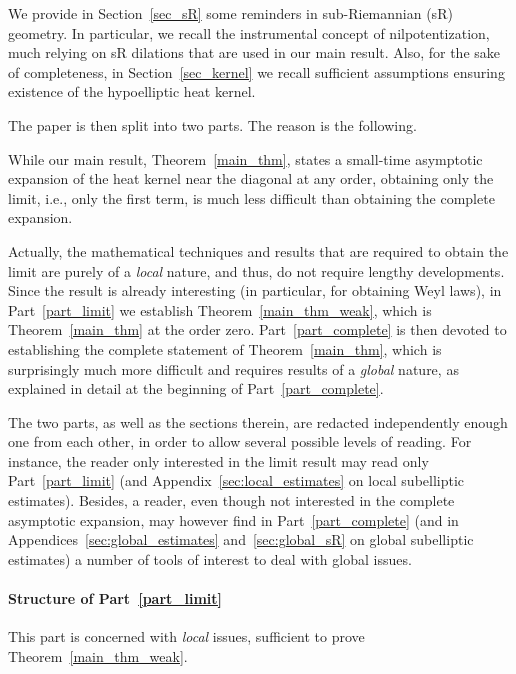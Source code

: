 \documentclass[10pt]{amsart}
\theoremstyle{definition}\newtheorem{defi}[theo]{Definition}\newtheorem{rema}[theo]{Remark}\newtheorem{exam}[theo]{Example}\newtheorem{exem}[theo]{Example}\newtheorem{nota}[theo]{Notation}
\begin{document}

We provide in Section~\ref{sec_sR} some reminders in sub-Riemannian (sR) geometry. In particular, we recall the instrumental concept of nilpotentization, much relying on sR dilations that are used in our main result. Also, for the sake of completeness, in Section~\ref{sec_kernel} we recall sufficient assumptions ensuring existence of the hypoelliptic heat kernel.


The paper is then split into two parts. The reason is the following.

While our main result, Theorem~\ref{main_thm}, states a small-time asymptotic expansion of the heat kernel near the diagonal at any order, obtaining only the limit, i.e., only the first term, is much less difficult than obtaining the complete expansion.

Actually, the mathematical techniques and results that are required to obtain the limit are purely of a \emph{local} nature, and thus, do not require lengthy developments. Since the result is already interesting (in particular, for obtaining Weyl laws), in Part~\ref{part_limit} we establish Theorem~\ref{main_thm_weak}, which is Theorem~\ref{main_thm} at the order zero. Part~\ref{part_complete} is then devoted to establishing the complete statement of Theorem~\ref{main_thm}, which is surprisingly much more difficult and requires results of a \emph{global} nature, as explained in detail at the beginning of Part~\ref{part_complete}.

The two parts, as well as the sections therein, are redacted independently enough one from each other, in order to allow several possible levels of reading. For instance, the reader only interested in the limit result may read only Part~\ref{part_limit} (and Appendix~\ref{sec:local_estimates} on local subelliptic estimates). Besides, a reader, even though not interested in the complete asymptotic expansion, may however find in Part~\ref{part_complete} (and in Appendices~\ref{sec:global_estimates} and~\ref{sec:global_sR} on global subelliptic estimates) a number of tools of interest to deal with global issues.


\goodbreak
\paragraph{Structure of Part~\ref{part_limit}}
This part is concerned with \emph{local} issues, sufficient to prove Theorem~\ref{main_thm_weak}.
\end{document}
